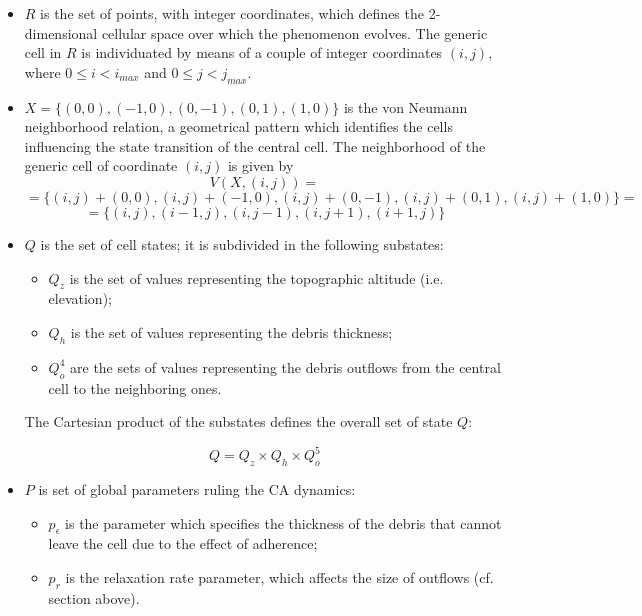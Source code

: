 \begin{itemize}

\item $R$ is the set of points, with integer coordinates, which
  defines the 2-dimensional cellular space over which the phenomenon
  evolves. The generic cell in $R$ is individuated by means of a
  couple of integer coordinates $(i, j)$, where $0 \leq i < i_{max}$
  and $0 \leq j < j_{max}$.

\item $X = \{(0,0), (-1, 0), (0, -1), (0, 1), (1, 0)\}$ is the von
  Neumann neighborhood relation, a geometrical pattern which
  identifies the cells influencing the state transition of the central
  cell. The neighborhood of the generic cell of coordinate $(i, j)$ is
  given by
$$V(X, (i, j)) =$$
$$= \{(i, j)+(0,0), (i, j)+(-1, 0), (i, j)+(0, -1),
(i, j)+(0, 1), (i, j)+(1, 0)\} =$$
$$= \{(i, j), (i-1, j), (i, j-1), (i, j+1), (i+1, j)\}$$

\item $Q$ is the set of cell states; it is subdivided in the following
  substates:

\begin{itemize}
    \item   $Q_z$ is the set of values representing the topographic altitude (i.e. elevation);
    \item   $Q_h$ is the set of values representing the debris thickness;
    \item   $Q_o^4$ are the sets of values representing the debris outflows from the central cell to the neighboring ones.
\end{itemize}

The Cartesian product of the substates defines the overall set of
state $Q$:

$$Q = Q_z \times Q_h \times Q_o^5$$

\item   $P$ is set of global parameters ruling the CA dynamics:

\begin{itemize}
    \item   $p_\epsilon$ is the parameter which specifies the thickness of the debris that cannot leave the cell due to the effect of adherence;
    \item   $p_r$ is the relaxation rate parameter, which affects the size of outflows (cf. section above).
\end{itemize}


\end{itemize}
